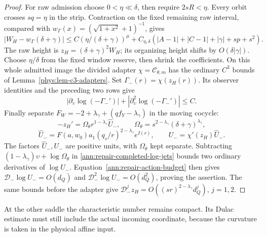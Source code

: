 \begin{proof}
For raw admission choose \(0<\eta\ll\delta\), then require
\(2sR<\eta\). Every orbit crosses \(sq=\eta\) in the strip.
Contraction on the fixed remaining raw interval, compared with
\(w_\Gamma(x)=(\sqrt{1+x^2}+1)^{-1}\), gives
\[
 |W_H-w_\Gamma(\delta+\gamma)|
 \le C(\eta/(\delta+\gamma))^\mu
 +C_{\eta,\delta}(|A-1|+|C-1|+|\gamma|+sp+s^2).
\]
The raw height is \(z_H=(\delta+\gamma)^2W_H\); its organizing
height shifts by \(O(\delta|\gamma|)\). Choose \(\eta/\delta\)
from the fixed window reserve, then shrink the coefficients. On this
whole admitted image the divided adapter \(\chi=\mathcal C_{\theta,m}\)
has the ordinary \(C^3\) bounds of Lemma~\ref{phys:lem-c3-adapters}.
Set \(\Gamma_-(r)=\chi(z_H(r))\). Its observer identities and the
preceding two rows give
\begin{equation}\label{ann:repair-completed-log-jets}
 |\partial_\upsilon\log(-\Gamma_-')|
 +|\partial_\upsilon^2\log(-\Gamma_-')|\le C.
\end{equation}
Finally separate \(F_W=-2+\lambda_\gamma+(qf_Y-\lambda_\gamma)\)
in the moving cocycle:
\begin{equation}\label{ann:negative-raw-gate-factor}
 -z_H'=\Omega_\theta r^{1-\lambda_\gamma}\widehat U_-,\qquad
 \Omega_\theta=s^{2-\lambda_\gamma}(\delta+\gamma)^{\lambda_\gamma},
\end{equation}
\begin{equation}\label{ann:repair-unit-factor}
 \widehat U_-=F(a,w_0)a_1(q_s/r)^{2-\lambda_\gamma}e^{I(r)},\qquad
 U_-=\chi'(z_H)\widehat U_-.
\end{equation}
The factors \(\widehat U_-,U_-\) are positive units, with
\(\Omega_\theta\) kept separate. Subtracting
\((1-\lambda_\gamma)\upsilon+\log\Omega_\theta\) in
\eqref{ann:repair-completed-log-jets} bounds two ordinary derivatives
of \(\log U_-\). Equation~\eqref{ann:repair-action-budget} then gives
\(\mathcal D_-\log U_-=O(d_Q)\) and
\(\mathcal D_-^2\log U_-=O(d_Q^2)\), proving the assertion.
The same bounds before the adapter give
\(\mathcal D_-^jz_H=O((sr)^{2-\lambda_\gamma}d_Q^j)\), \(j=1,2\).
\end{proof}

At the other saddle the characteristic number remains compact.
Its Dulac estimate must still include the actual incoming coordinate,
because the curvature is taken in the physical affine input.

